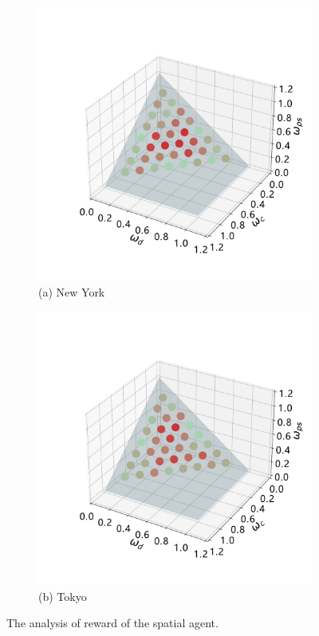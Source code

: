 \documentclass[letterpaper]{article} %
\begin{document}
\begin{figure}[!th]
\centering
\begin{subfigure}{.24\textwidth}
  \centering
  \includegraphics[width=\linewidth]{fig8_nyc.pdf}
  \scriptsize (a) New York
\end{subfigure}%
\begin{subfigure}{.24\textwidth}
  \centering
  \includegraphics[width=\linewidth]{fig8_tokyo.pdf}
  \scriptsize (b) Tokyo
\end{subfigure}
\caption{The analysis of reward of the spatial agent.}
\label{fig: spatial reward}
\end{figure}
\end{document}
